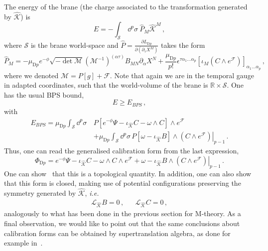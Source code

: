 \documentclass[debug]{phd}
\begin{document}
The energy of the brane (the charge associated to the transformation generated by $\hat{\mathcal{K}}$) is
%
	\begin{equation} 
		E = - \int_{\mathcal{S}}\ \dd ^p \sigma\ \hat{P}_M \hat{\mathcal{K}}^M \, ,
	\end{equation} 
%
where $\mathcal{S}$ is the brane world-space and $\hat{P} = \tfrac{\partial L_{\mathrm{D}p}}{\partial (\partial_\tau X^M)}$ takes the form
%
	\begin{equation} 
		\hat{P}_M = - \mu_{\mathrm{D}p} e^{- \phi} \sqrt{- \det \mathcal{M}} (\mathcal{M}^{-1})^{( \alpha  \tau)} B_{MN} \partial_\alpha  X^N 
			+ \frac{\mu_{\mathrm{D}p}}{p!} \epsilon^{\tau \alpha _1 \ldots \alpha _p} \left[ \iota_M (C \wedge e^\mathcal{F}) \right]_{\alpha _1 \ldots \alpha_p} \, ,
	\end{equation} 
%
where we denoted $\mathcal{M} = P[g] + \mathcal{F}$. 
Note that again we are in the temporal gauge in adapted coordinates, such that the world-volume of the brane is $\mathbb{R}\times \mathcal{S}$.
%
%
%
One has the usual BPS bound,
%
	\begin{equation} 
		E \geq E_{BPS}\, ,
	\end{equation} 
%
with
%
	\begin{equation} 
		\label{BPScal}
			\begin{split}
				E_{BPS} =\mu_{\mathrm{D}p} \int_\mathcal{S} \dd ^p \sigma\, &P\left[e^{- \phi} \Psi - \iota_{\hat{\mathcal{K}}} C - \omega \wedge C \right] \wedge e^{\mathcal{F}} \\
					&+ \mu_{\mathrm{D}p}\int_{\mathcal{S}}\dd ^p \sigma\, P\left[\omega-\iota_{\hat{\mathcal{K}}}B\right] \wedge \left.\left(C \wedge e^{\mathcal{F}}\right)\right\vert_{p-1} \, .
			\end{split}
	\end{equation} 
%
Thus, one can read the generalised calibration form from the last expression,
%
	\begin{equation} 
	\label{BPScal2}
		\Phi_{\mathrm{D}p} = e^{- \phi} \Psi - \iota_{\hat{\mathcal{K}}} C - \omega \wedge C \wedge e^{\mathcal{F}} + \omega-\iota_{\hat{\mathcal{K}}}B \wedge \left.\left(C \wedge e^{\mathcal{F}}\right)\right\vert_{p-1}\, .
	\end{equation} 
%
One can show~\cite{Martucci:2011dn, Evslin:2007ti} that this is a topological quantity.
In addition, one can also show that this form is closed, making use of potential configurations preserving the symmetry generated by $\hat{\mathcal{K}}$, \emph{i.e.}
%
	\begin{align}
	\label{vanpot}
		&&\mathcal{L}_{\hat{\mathcal{K}}} B = 0\, , & &\mathcal{L}_{\hat{\mathcal{K}}} C = 0\, ,&&
	\end{align}
%
analogously to what has been done in the previous section for M-theory. 
As a final observation, we would like to point out that the same conclusions about calibration forms can be obtained by supertranslation algebra, as done for example in~\cite{Cascales:2004qp, Gutowski:1999tu,HPS04}. \\
\end{document}
